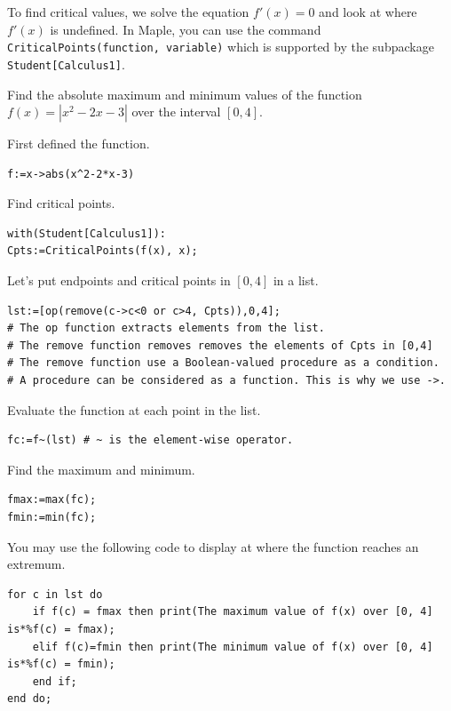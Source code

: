 \documentclass[
  en,11pt,simple]{elegantbook}
\renewenvironment{example}[1][]{
  \refstepcounter{exam}
  \par\noindent\textbf{\color{main}{\examplename} \theexam #1}
  \rmfamily
}{
  \par\ignorespacesafterend
}
\begin{document}
To find critical values, we solve the equation \(f'(x)=0\) and look at where \(f'(x)\) is undefined. In Maple, you can use the command \texttt{CriticalPoints(function,\ variable)} which is supported by the subpackage \texttt{Student{[}Calculus1{]}}.

\begin{example}

Find the absolute maximum and minimum values of the function \(f(x)=|x^2-2x-3|\) over the interval \([0, 4]\).
\end{example}

\begin{solution}
{}
First defined the function.

\begin{verbatim}
f:=x->abs(x^2-2*x-3)
\end{verbatim}

Find critical points.

\begin{verbatim}
with(Student[Calculus1]):
Cpts:=CriticalPoints(f(x), x);
\end{verbatim}

Let's put endpoints and critical points in \([0,4]\) in a list.

\begin{verbatim}
lst:=[op(remove(c->c<0 or c>4, Cpts)),0,4];
# The op function extracts elements from the list.
# The remove function removes removes the elements of Cpts in [0,4]
# The remove function use a Boolean-valued procedure as a condition.
# A procedure can be considered as a function. This is why we use ->. 
\end{verbatim}

Evaluate the function at each point in the list.

\begin{verbatim}
fc:=f~(lst) # ~ is the element-wise operator.
\end{verbatim}

Find the maximum and minimum.

\begin{verbatim}
fmax:=max(fc);
fmin:=min(fc);
\end{verbatim}

You may use the following code to display at where the function reaches an extremum.

\begin{verbatim}
for c in lst do
    if f(c) = fmax then print(The maximum value of f(x) over [0, 4] is*%f(c) = fmax);
    elif f(c)=fmin then print(The minimum value of f(x) over [0, 4] is*%f(c) = fmin);
    end if;
end do;
\end{verbatim}
\end{solution}
\end{document}
